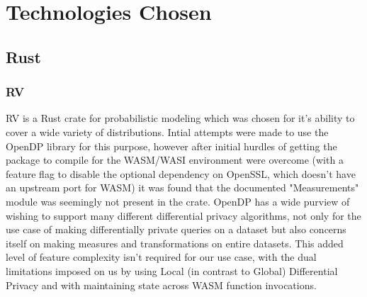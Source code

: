 \chapter{Technologies Chosen\label{chap:{technologies}}}


\section{Rust}
\subsection{RV}
RV is a Rust crate for probabilistic modeling which was chosen for it's ability to cover a wide variety of distributions. Intial attempts were made to use the OpenDP library for this purpose, however after initial hurdles of getting the package to compile for the WASM/WASI environment were overcome (with a feature flag to disable the optional dependency on OpenSSL, which doesn't have an upstream port for WASM) it was found that the documented "Measurements" module was seemingly not present in the crate. OpenDP has a wide purview of wishing to support many different differential privacy algorithms, not only for the use case of making differentially private queries on a dataset but also concerns itself on making measures and transformations on entire datasets. This added level of feature complexity isn't required for our use case, with the dual limitations imposed on us by using Local (in contrast to Global) Differential Privacy and with maintaining state across WASM function invocations.   

